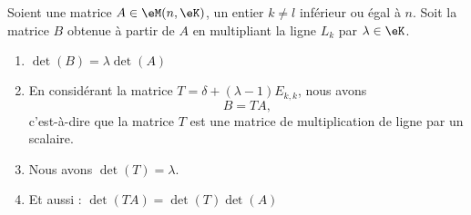 \begin{proposition} \label{PROPooXUFKooOaPnna}
	Soient une matrice \( A\in \eM(n,\eK)\), un entier \( k\neq l\) inférieur ou égal à \( n\). Soit la matrice \( B\) obtenue à partir de \( A\) en multipliant la ligne \( L_k\) par \( \lambda\in \eK\).
	\begin{enumerate}
		\item       \label{ITEMooBKIGooCDQEDt}
		      \( \det(B)=\lambda\det(A)\)
		\item       \label{ITEMooWRRCooFXkRNW}
		      En considérant la matrice \( T=\delta+(\lambda-1)E_{k,k}\), nous avons
		      \begin{equation}
			      B=TA,
		      \end{equation}
		      c'est-à-dire que la matrice \( T\) est une matrice de multiplication de ligne par un scalaire.
		\item       \label{ITEMooOGGDooPVVRzk}
		      Nous avons \( \det(T)=\lambda\).
		\item       \label{ITEMooIFRVooWQYgkK}
		      Et aussi : \( \det(TA)=\det(T)\det(A)\)
	\end{enumerate}
\end{proposition}


